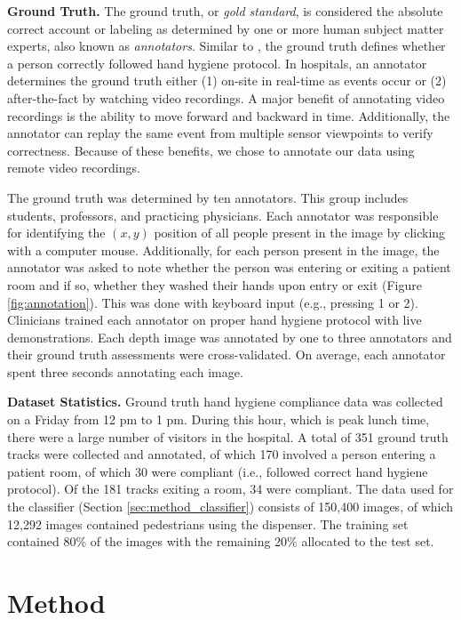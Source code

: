 \documentclass[twoside,11pt]{article}
\begin{document}
\textbf{Ground Truth.}
The ground truth, or \textit{gold standard}, is considered the absolute correct account or labeling as determined by one or more human subject matter experts, also known as \textit{annotators}.
Similar to \citet{armellino2012using}, the ground truth defines whether a person correctly followed hand hygiene protocol.
In hospitals, an annotator determines the ground truth either (1) on-site in real-time as events occur or (2) after-the-fact by watching video recordings.
A major benefit of annotating video recordings is the ability to move forward and backward in time.
Additionally, the annotator can replay the same event from multiple sensor viewpoints to verify correctness.
Because of these benefits, we chose to annotate our data using remote video recordings.

The ground truth was determined by ten annotators.
This group includes students, professors, and practicing physicians.
Each annotator was responsible for identifying the $(x,y)$ position of all people present in the image by clicking with a computer mouse.
Additionally, for each person present in the image, the annotator was asked to note whether the person was entering or exiting a patient room and if so, whether they washed their hands upon entry or exit (Figure \ref{fig:annotation}).
This was done with keyboard input (e.g., pressing 1 or 2).
Clinicians trained each annotator on proper hand hygiene protocol with live demonstrations.
Each depth image was annotated by one to three annotators and their ground truth assessments were cross-validated.
On average, each annotator spent three seconds annotating each image.

\textbf{Dataset Statistics.}
Ground truth hand hygiene compliance data was collected on a Friday from 12 pm to 1 pm.
During this hour, which is peak lunch time, there were a large number of visitors in the hospital.
A total of 351 ground truth tracks were collected and annotated, of which 170 involved a person entering a patient room, of which 30 were compliant (i.e., followed correct hand hygiene protocol). Of the 181 tracks exiting a room, 34 were compliant.
The data used for the classifier (Section \ref{sec:method_classifier}) consists of 150,400 images, of which 12,292 images contained pedestrians using the dispenser. The training set contained 80\% of the images with the remaining 20\% allocated to the test set.

\section{Method}\label{sec:method}
\end{document}
